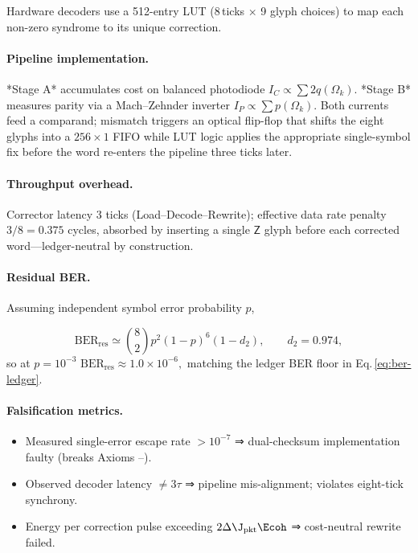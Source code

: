 \documentclass[11pt,oneside]{book}
\begin{document}
Hardware decoders use a 512-entry LUT (8 ticks × 9 glyph choices)
to map each non-zero syndrome to its unique correction.

\paragraph{Pipeline implementation.}

*Stage A* accumulates cost on balanced photodiode \(I_{C}\propto
\sum 2q(\Omega_{k})\).  
*Stage B* measures parity via a Mach–Zehnder inverter
\(I_{P}\propto\sum p(\Omega_{k})\).  
Both currents feed a comparand; mismatch triggers an optical
flip-flop that shifts the eight glyphs into a \(256\times1\) FIFO
while LUT logic applies the appropriate single-symbol fix before the
word re-enters the pipeline three ticks later.

\paragraph{Throughput overhead.}

Corrector latency 3 ticks
(Load–Decode–Rewrite);  
effective data rate penalty  
\(3/8 = 0.375\) cycles,
absorbed by inserting a single $\mathsf{Z}$ glyph before each
corrected word—ledger-neutral by construction.

\paragraph{Residual BER.}

Assuming independent symbol error probability \(p\),

\[
   \mathrm{BER}_{\text{res}}
   \simeq
   \binom{8}{2}p^{2}(1-p)^{6}(1-d_{2}),
   \qquad
   d_{2}=0.974,
\]
so at \(p=10^{-3}\)
\(
   \mathrm{BER}_{\text{res}}\approx1.0\times10^{-6},
\)
matching the ledger BER floor in Eq.\,\eqref{eq:ber-ledger}.

\paragraph{Falsification metrics.}

\begin{itemize}\setlength\itemsep{3pt}
\item Measured single-error escape rate \(>10^{-7}\)  
      ⇒ dual-checksum implementation faulty
      (breaks Axioms –).
\item Observed decoder latency \(\neq3\tau\)
      ⇒ pipeline mis-alignment; violates eight-tick synchrony.
\item Energy per correction pulse
      exceeding \(2\Delta\J_{\text{pkt}}\Ecoh\)  
      ⇒ cost-neutral rewrite failed.
\end{itemize}
\end{document}
